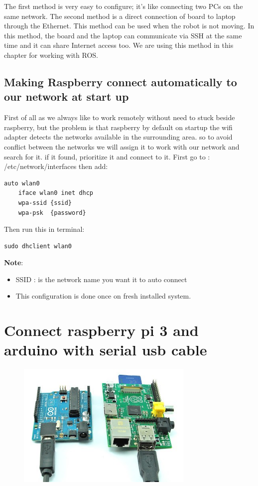 The first method is very easy to configure; it's like connecting two PCs on the same network. 
The second method is a direct connection of board to laptop through the Ethernet. This method can be used when the robot is not moving.
In this method, the board and the laptop can communicate via SSH at the same time and it can share 
Internet access too. We are using this method in this chapter for working with ROS.

\subsection{Making Raspberry connect automatically to our network at start up }
First of all as we always like to work remotely without need to stuck beside raspberry, but the problem is that raspberry by default on startup the wifi adapter detects the networks available in the surrounding area. so to avoid conflict between the networks we will assign it to work with our network and search for it. 
if it found, prioritize it and connect to it.
First go to : /etc/network/interfaces
then add:
\begin{lstlisting}[language=XML]
auto wlan0
	iface wlan0 inet dhcp 
	wpa-ssid {ssid}
	wpa-psk  {password}
\end{lstlisting}
Then run this in terminal:
\begin{lstlisting}[language=XML]
sudo dhclient wlan0
\end{lstlisting}
\textbf{Note}:

\begin{itemize}
\item SSID : is the network name you want it to auto connect\\
\item This configuration is done once on fresh installed system. 

\end{itemize}
\clearpage
\section{Connect raspberry pi 3 and arduino with serial usb cable}


\begin{figure}[h]
	\centering
	\includegraphics[width=8.47cm,height=5.99cm]{figures/s12.jpg}
\end{figure}


